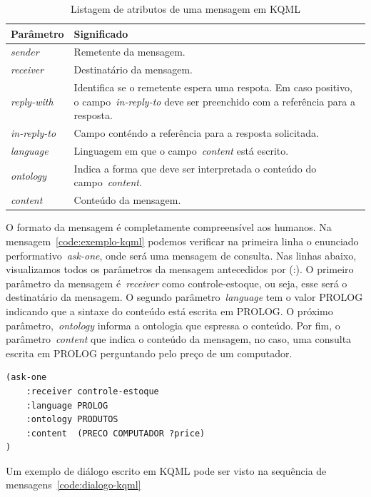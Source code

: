 \begin{table}
	\caption{Listagem de atributos de uma mensagem em KQML}
	\begin{tabular}{|p{3cm} | p{12cm} |}
		\hline
		\textbf{Parâmetro}	& \textbf{Significado}	\\
		\hline
		\emph{sender}		& Remetente da mensagem. \\
		\hline
		\emph{receiver}	& Destinatário da mensagem. \\
		\hline
		\emph{reply-with}	& Identifica se o remetente espera uma respota. Em caso positivo, o campo~\emph{in-reply-to} deve ser preenchido com a referência para a resposta. \\
		\hline
		\emph{in-reply-to}	& Campo conténdo a referência para a resposta solicitada. \\
		\hline
		\emph{language}	& Linguagem em que o campo~\emph{content} está escrito. \\ 
		\hline
		\emph{ontology}	& Indica a forma que deve ser interpretada o conteúdo do campo~\emph{content}. \\
		\hline
		\emph{content}		& Conteúdo da mensagem. \\
		\hline
	\end{tabular}
	\label{parametros_kqml}
\end{table}
O formato da mensagem é completamente compreensível aos humanos. Na mensagem~\ref{code:exemplo-kqml} podemos verificar na primeira linha o enunciado performativo~\emph{ask-one}, onde será uma mensagem de consulta. Nas linhas abaixo, visualizamos todos os parâmetros da mensagem antecedidos por (:). O primeiro parâmetro da mensagem é~\emph{receiver} como controle-estoque, ou seja, esse será o destinatário da mensagem. O segundo parâmetro~\emph{language} tem o valor PROLOG indicando que a sintaxe do conteúdo está escrita em PROLOG. O próximo parâmetro,~\emph{ontology} informa a ontologia que espressa o conteúdo. Por fim, o parâmetro~\emph{content} que indica o conteúdo da mensagem, no caso, uma consulta escrita em PROLOG perguntando pelo preço de um computador.

\begin{lstlisting}[label=code:exemplo-kqml,caption=Exemplo de mensagem em KQML]
(ask-one
	:receiver controle-estoque
	:language PROLOG
	:ontology PRODUTOS
	:content  (PRECO COMPUTADOR ?price)
)
\end{lstlisting}

Um exemplo de diálogo escrito em KQML pode ser visto na sequência de mensagens~\ref{code:dialogo-kqml}

